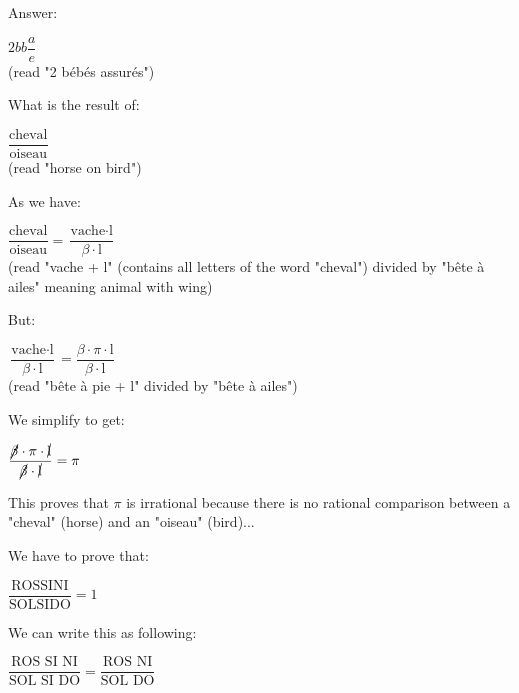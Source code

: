	Answer: 
	\begin{center}
		$2bb \dfrac{a}{e}$\\
		(read "2 bébés assurés")
	\end{center} 
	\begin{center}\underline{\hspace{5 cm}}\end{center}
	
	What is the result of: 
	\begin{center}
	 $\dfrac{\text{cheval}}{\text{oiseau}}$\\
	(read "horse on bird")
	 \end{center} 
	
	As we have: 
	\begin{center}
	 $\dfrac{\text{cheval}}{\text{oiseau}}=\dfrac{\text{vache} \cdot \text{l}}{\beta \cdot \text{l}}$\\
	(read "vache + l" (contains all letters of the word "cheval") divided by "bête à ailes" meaning animal with wing) 
	 \end{center} 
	
	But: 
	\begin{center}
	 $\dfrac{\text{vache} \cdot \text{l}}{\beta \cdot \text{l}}=\dfrac{\beta \cdot \pi \cdot \text{l}}{\beta \cdot \text{l}}$\\
	(read "bête à pie + l" divided by "bête à ailes")  
	 \end{center}
	
	We simplify to get: 
	\begin{center}
	 $\dfrac{\cancel{\beta} \cdot \pi \cdot \cancel{\text{l}}}{\cancel{\beta} \cdot \cancel{\text{l}}}=\pi$  
	 \end{center}
	
	This proves that $\pi$ is irrational because there is no rational comparison between a "cheval" (horse) and an "oiseau" (bird)... 
		\begin{center}\underline{\hspace{5 cm}}\end{center}
	\pagebreak
	We have to prove that:
	\begin{center}
	$\dfrac{\text{ROSSINI}}{\text{SOLSIDO}}=1$  
	\end{center} 
	
	We can write this as following:
	\begin{center}
	$\dfrac{\text{ROS SI NI}}{\text{SOL SI DO}}=\dfrac{\text{ROS NI}}{\text{SOL DO}}$  
	\end{center}
	
